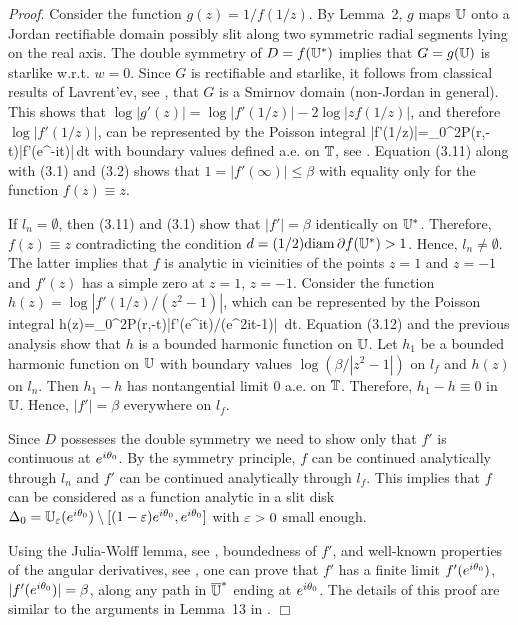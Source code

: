 {\it Proof}. Consider the function $g(z)=1/f(1/z)$. By Lemma~2, $g$ maps ${\Bbb{U}}$ onto a Jordan rectifiable domain possibly slit along
two symmetric radial segments lying on the real axis. The double symmetry of $D=f({\Bbb{U}}^*)$ implies that $G=g({\Bbb{U}})$ is starlike
w.r.t. $w=0$. Since $G$ is rectifiable and starlike, it follows from classical results of Lavrent'ev, see \cite[p.163]{P}, that $G$ is a Smirnov
domain (non-Jordan in general). This shows that $\log|g'(z)|=\log|f'(1/z)|-2\log|zf(1/z)|$, and therefore $\log|f'(1/z)|$, 
can be represented by the Poisson integral
\be
\log|f'(1/z)|=\int_0^{2\pi}P(r,\th-t)\log|f'(e^{-it})|\,dt
\ee
with boundary values defined a.e. on ${\Bbb{T}}$, see \cite[p. 155]{P}. Equation (3.11) along with (3.1) and (3.2) shows that $1=|f'(\infty)|\le \beta$ with
 equality only for the function $f(z) \equiv z$.

If $l_n=\emptyset$, then (3.11) and (3.1) show that $|f'|=\beta$ identically on ${\Bbb{U}}^*$. Therefore, $f(z)\equiv z$ contradicting the 
condition $d=(1/2){\rm diam}\, \partial f({\Bbb{U}}^*)>1$. Hence, $l_n\not=\emptyset$. The latter implies that $f$ is analytic in  vicinities of the points
$z=1$ and $z=-1$ and $f'(z)$ has a simple zero at $z=1$, $z=-1$. Consider the function $h(z)=\log |f'(1/z)/(z^2-1)|$, 
which can be represented by the Poisson integral
\be
h(z)=\int_0^{2\pi}P(r,\th-t)\log|f'(e^{it})/(e^{2it}-1)|\, dt.
\ee
Equation (3.12) and the previous analysis show that $h$ is a bounded harmonic function on ${\Bbb{U}}$. Let $h_1$ be a bounded harmonic function on ${\Bbb{U}}$
with boundary values $\log(\beta/|z^2-1|)$ on $l_f$ and $h(z)$ on $l_n$. Then $h_1-h$ has nontangential limit $0$ a.e. on ${\Bbb{T}}$. Therefore,
$h_1-h \equiv 0$ in ${\Bbb{U}}$. Hence, $|f'|=\beta$ everywhere on $l_f$.

\smallskip

Since $D$ possesses the double symmetry we need to show only that $f'$ is continuous at $e^{i\theta_0}$. By the symmetry principle,
$f$ can be continued analytically through $l_n$ and $f'$ can be continued analytically through $l_f$. This implies that $f$ can 
be considered as a function analytic in a slit disk $\Delta_0={\Bbb{U}}_\varepsilon(e^{i\theta_0})\setminus [(1-\varepsilon)e^{i\theta_0},e^{i\theta_0}]$ with
$\varepsilon>0$ small enough.

Using the Julia-Wolff lemma, see \cite[Proposition~4.13]{P}, boundedness of $f'$, and well-known properties of the angular derivatives,
see \cite[Propositions 4.7, 4.9]{P}, one can prove that $f'$ has a finite limit $f'(e^{i\theta_0})$, $|f'(e^{i\theta_0})|=\beta$, along any
path in $\overline{{\Bbb{U}}}^*$ ending at $e^{i\theta_0}$. The details of this proof are similar to the arguments in Lemma~13 in \cite{BS}.
$\Box$

